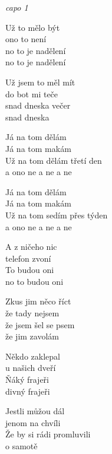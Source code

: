 
\re{}\textit{capo 1}

\ve{}
Už to mělo být\\
ono to není\\
no to je nadělení\\
no to je nadělení

\ve{}
Už jsem to měl mít\\
do bot mi teče\\
snad dneska večer\\
snad dneska

\cho{}
Já na tom dělám\\
Já na tom makám\\
Už na tom dělám třetí den\\
a ono ne a ne a ne

Já na tom dělám\\
Já na tom makám\\
Už na tom sedím přes týden\\
a ono ne a ne a ne

\ve{}
A z ničeho nic\\
telefon zvoní\\
To budou oni\\
no to budou oni

\ve{}
Zkus jim něco říct\\
že tady nejsem\\
že jsem šel se psem\\
že jim zavolám

\cho{}

\re{}
\cho{}

\ve{}
Někdo zaklepal\\
u našich dveří\\
Ňáký frajeři\\
divný frajeři

\ve{}
Jestli můžou dál\\
jenom na chvíli\\
Že by si rádi promluvili\\
o samotě

\cho{}


\esong